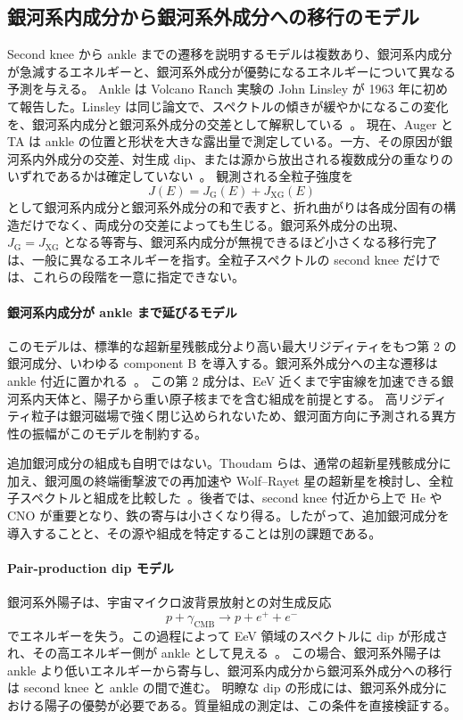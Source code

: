 \documentclass[book,paper=a4,fontsize=11pt]{jlreq}
\begin{document}
\subsection{銀河系内成分から銀河系外成分への移行のモデル}\label{subsec:galactic_transition}
Second knee から ankle までの遷移を説明するモデルは複数あり、銀河系内成分が急減するエネルギーと、銀河系外成分が優勢になるエネルギーについて異なる予測を与える。
Ankle は Volcano Ranch 実験の John Linsley が 1963 年に初めて報告した。Linsley は同じ論文で、スペクトルの傾きが緩やかになるこの変化を、銀河系内成分と銀河系外成分の交差として解釈している~\cite{LinsleyAnkle1963,DelignyAnkle2014}。
現在、Auger と TA は ankle の位置と形状を大きな露出量で測定している。一方、その原因が銀河系内外成分の交差、対生成 dip、または源から放出される複数成分の重なりのいずれであるかは確定していない~\cite{AugerSpectrum2020,AugerTAEnergyScale2019}。
観測される全粒子強度を
\begin{equation}
  J(E)=J_{\mathrm{G}}(E)+J_{\mathrm{XG}}(E)
\end{equation}
として銀河系内成分と銀河系外成分の和で表すと、折れ曲がりは各成分固有の構造だけでなく、両成分の交差によっても生じる。銀河系外成分の出現、\(J_{\mathrm G}=J_{\mathrm{XG}}\) となる等寄与、銀河系内成分が無視できるほど小さくなる移行完了は、一般に異なるエネルギーを指す。全粒子スペクトルの second knee だけでは、これらの段階を一意に指定できない。

\paragraph{銀河系内成分が ankle まで延びるモデル}
このモデルは、標準的な超新星残骸成分より高い最大リジディティをもつ第 2 の銀河成分、いわゆる component B を導入する。銀河系外成分への主な遷移は ankle 付近に置かれる~\cite{Hillas2005}。
この第 2 成分は、EeV 近くまで宇宙線を加速できる銀河系内天体と、陽子から重い原子核までを含む組成を前提とする。
高リジディティ粒子は銀河磁場で強く閉じ込められないため、銀河面方向に予測される異方性の振幅がこのモデルを制約する。

追加銀河成分の組成も自明ではない。Thoudam らは、通常の超新星残骸成分に加え、銀河風の終端衝撃波での再加速や Wolf--Rayet 星の超新星を検討し、全粒子スペクトルと組成を比較した~\cite{Thoudam2016SecondGalactic}。後者では、second knee 付近から上で He や CNO が重要となり、鉄の寄与は小さくなり得る。したがって、追加銀河成分を導入することと、その源や組成を特定することは別の課題である。

\paragraph{Pair-production dip モデル}
銀河系外陽子は、宇宙マイクロ波背景放射との対生成反応
\begin{equation}
  p+\gamma_{\mathrm{CMB}}\rightarrow p+e^++e^-
\end{equation}
でエネルギーを失う。この過程によって EeV 領域のスペクトルに dip が形成され、その高エネルギー側が ankle として見える~\cite{BerezinskyDip2006}。
この場合、銀河系外陽子は ankle より低いエネルギーから寄与し、銀河系内成分から銀河系外成分への移行は second knee と ankle の間で進む。
明瞭な dip の形成には、銀河系外成分における陽子の優勢が必要である。質量組成の測定は、この条件を直接検証する。
\end{document}
